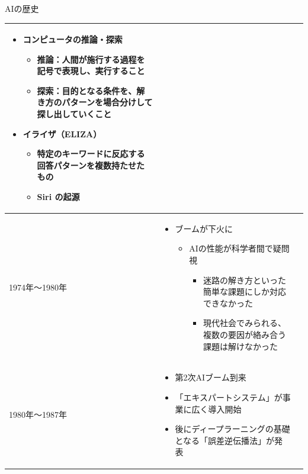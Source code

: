 \documentclass[dvipdfmx,aspectratio=169]{beamer}
\begin{document}
\begin{frame}[shrink]{AIの歴史}
\begin{table}[h]
\begin{tabular}{lp{35em}p{40em}}
\begin{minipage}{40em}
											\begin{itemize}
												\item コンピュータの\alert{推論}・\alert{探索}
												\begin{itemize}
													\item 推論：人間が施行する過程を記号で表現し、実行すること
													\item 探索：目的となる条件を、解き方のパターンを場合分けして探し出していくこと
												\end{itemize}
												\item \alert{イライザ}（ELIZA）
												\begin{itemize}
													\item 特定のキーワードに反応する回答パターンを複数持たせたもの
													\item Siri の起源
												\end{itemize}
											\end{itemize}
										\end{minipage} \\
				\midrule
				1974年～1980年            & \begin{minipage}{35em}
												\begin{itemize}
													\item ブームが下火に
													\begin{itemize}
														\item AIの性能が科学者間で疑問視
														\begin{itemize}
															\item 迷路の解き方といった簡単な課題にしか対応できなかった
															\item 現代社会でみられる、複数の要因が絡み合う課題は解けなかった
														\end{itemize}
													\end{itemize}
												\end{itemize}
											\end{minipage} & \\
				\midrule
				1980年～1987年            & \begin{minipage}{35em}
												\begin{itemize}
													\item 第2次AIブーム到来
													\item 「\alert{エキスパートシステム}」が事業に広く導入開始
													\item 後にディープラーニングの基礎となる「\alert{誤差逆伝播法}」が発表

\end{itemize}
\end{minipage}
\end{tabular}
\end{table}
\end{frame}
\end{document}
